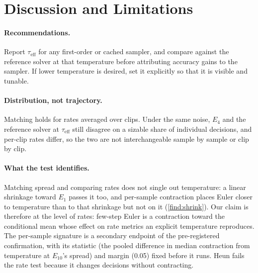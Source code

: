 \documentclass{article}
\theoremstyle{plain}
\theoremstyle{definition}
\theoremstyle{remark}
\newcommand{\taueff}{\tau_{\mathrm{eff}}}
\begin{document}
\section{Discussion and Limitations}
\label{sec:discussion}
\paragraph{Recommendations.} Report $\taueff$ for any first-order or cached sampler, and compare against the reference solver at that temperature before attributing accuracy gains to the sampler. If lower temperature is desired, set it explicitly so that it is visible and tunable.
\paragraph{Distribution, not trajectory.} Matching holds for rates averaged over clips. Under the same noise, $E_4$ and the reference solver at $\taueff$ still disagree on a sizable share of individual decisions, and per-clip rates differ, so the two are not interchangeable sample by sample or clip by clip.
\paragraph{What the test identifies.} Matching spread and comparing rates does not single out temperature: a linear shrinkage toward $E_1$ passes it too, and per-sample contraction places Euler closer to temperature than to that shrinkage but not on it (\cref{find:shrink}). Our claim is therefore at the level of rates: few-step Euler is a contraction toward the conditional mean whose effect on rate metrics an explicit temperature reproduces. The per-sample signature is a secondary endpoint of the pre-registered confirmation, with its statistic (the pooled difference in median contraction from temperature at $E_{10}$'s spread) and margin (0.05) fixed before it runs. Heun fails the rate test because it changes decisions without contracting.
\end{document}
